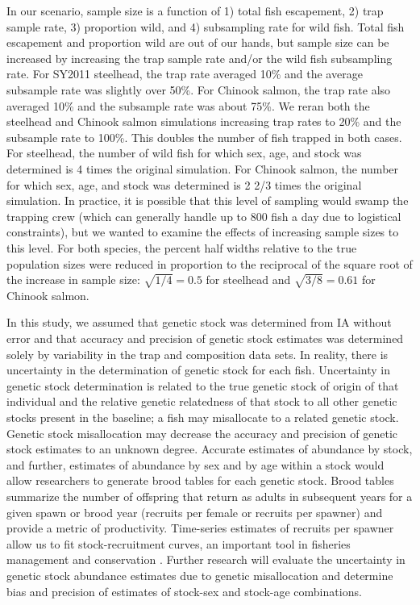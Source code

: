 \documentclass[%
                leqno,         %
%
]{nrc1}                          %
\begin{document}
In our scenario, sample size is a function of 1) total fish escapement, 2) trap sample rate, 3) proportion wild, and 4) subsampling rate for wild fish. Total fish escapement and proportion wild are out of our hands, but sample size can be increased by increasing the trap sample rate and/or the wild fish subsampling rate. For SY2011 steelhead, the trap rate averaged 10\% and the average subsample rate was slightly over 50\%. For Chinook salmon, the trap rate also averaged 10\% and the subsample rate was about 75\%. We reran both the steelhead and Chinook salmon simulations increasing trap rates to 20\% and the subsample rate to 100\%. This doubles the number of fish trapped in both cases. For steelhead, the number of wild fish for which sex, age, and stock was determined is 4 times the original simulation. For Chinook salmon, the number for which sex, age, and stock was determined is 2 2/3 times the original simulation. In practice, it is possible that this level of sampling would swamp the trapping crew (which can generally handle up to 800 fish a day due to logistical constraints), but we wanted to examine the effects of increasing sample sizes to this level. For both species, the percent half widths relative to the true population sizes were reduced in proportion to the reciprocal of the square root of the increase in sample size: $\sqrt{1/4} = 0.5$ for steelhead and $\sqrt{3/8} = 0.61$  for Chinook salmon.

In this study, we assumed that genetic stock was determined from IA without error and that accuracy and precision of genetic stock estimates was determined solely by variability in the trap and composition data sets. In reality, there is uncertainty in the determination of genetic stock for each fish. Uncertainty in genetic stock determination is related to the true genetic stock of origin of that individual and the relative genetic relatedness of that stock to all other genetic stocks present in the baseline; a fish may misallocate to a related genetic stock. Genetic stock misallocation may decrease the accuracy and precision of genetic stock estimates to an unknown degree. Accurate estimates of abundance by stock, and further, estimates of abundance by sex and by age within a stock would allow researchers to generate brood tables for each genetic stock. Brood tables summarize the number of offspring that return as adults in subsequent years for a given spawn or brood year (recruits per female or recruits per spawner) and provide a metric of productivity. Time-series estimates of recruits per spawner allow us to fit stock-recruitment curves, an important tool in fisheries management and conservation \citep{Ricker1973,Hilborn2003}. Further research will evaluate the uncertainty in genetic stock abundance estimates due to genetic misallocation and determine bias and precision of estimates of stock-sex and stock-age combinations.
\end{document}
